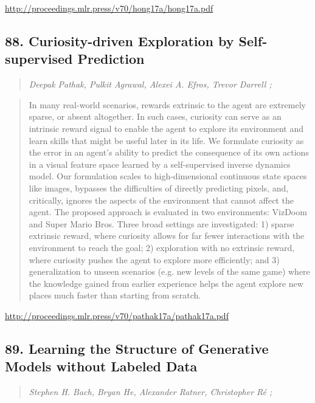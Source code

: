 \documentclass{article}
\begin{document}
\href{http://proceedings.mlr.press/v70/hong17a/hong17a.pdf}{http://proceedings.mlr.press/v70/hong17a/hong17a.pdf}

\subsection{88. Curiosity-driven Exploration by Self-supervised Prediction}

\begin{quote}
\footnotesize{\textit{Deepak Pathak, Pulkit Agrawal, Alexei A. Efros, Trevor Darrell ;}}

\end{quote}

\begin{quote}
    In many real-world scenarios, rewards extrinsic to the agent are extremely sparse, or absent altogether. In such cases, curiosity can serve as an intrinsic reward signal to enable the agent to explore its environment and learn skills that might be useful later in its life. We formulate curiosity as the error in an agent’s ability to predict the consequence of its own actions in a visual feature space learned by a self-supervised inverse dynamics model. Our formulation scales to high-dimensional continuous state spaces like images, bypasses the difficulties of directly predicting pixels, and, critically, ignores the aspects of the environment that cannot affect the agent. The proposed approach is evaluated in two environments: VizDoom and Super Mario Bros. Three broad settings are investigated: 1) sparse extrinsic reward, where curiosity allows for far fewer interactions with the environment to reach the goal; 2) exploration with no extrinsic reward, where curiosity pushes the agent to explore more efficiently; and 3) generalization to unseen scenarios (e.g. new levels of the same game) where the knowledge gained from earlier experience helps the agent explore new places much faster than starting from scratch.  
\end{quote}

\href{http://proceedings.mlr.press/v70/pathak17a/pathak17a.pdf}{http://proceedings.mlr.press/v70/pathak17a/pathak17a.pdf}

\subsection{89. Learning the Structure of Generative Models without Labeled Data}

\begin{quote}
\footnotesize{\textit{Stephen H. Bach, Bryan He, Alexander Ratner, Christopher Ré ;}}

\end{quote}
\end{document}
